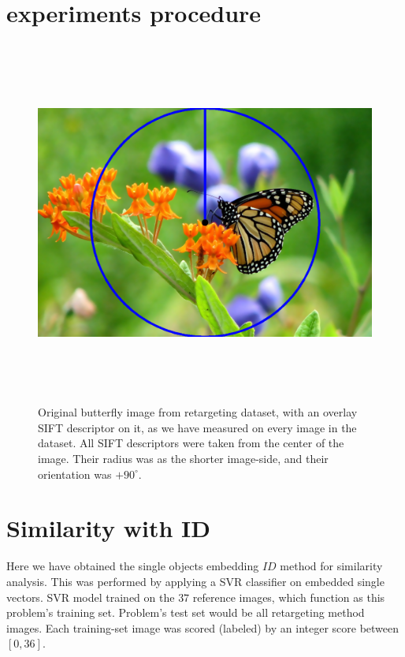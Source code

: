 \section{experiments procedure}


\begin{figure}[h] \label{single_sift}
	
	\includegraphics[width=\linewidth,height=12cm,keepaspectratio]{Figures/butterfly_sift}
	\caption[image single sift descriptor]
	{Original butterfly image from retargeting dataset, with an overlay SIFT descriptor on it, as we have measured on every image in the dataset. All SIFT descriptors were taken from the center of the image. Their radius was as the shorter image-side, and their orientation was $+90^{\circ}$.}
	
\end{figure}


\section{Similarity with ID}

Here we have obtained the single objects embedding $ID$ method for similarity analysis. This was performed by applying a SVR \cite{SVR} classifier on embedded single vectors.
SVR model trained on the $37$ reference images, which function as this problem's training set. Problem's test set would be all retargeting method images. Each training-set image was scored (labeled) by an integer score between $[0,36]$. \\

